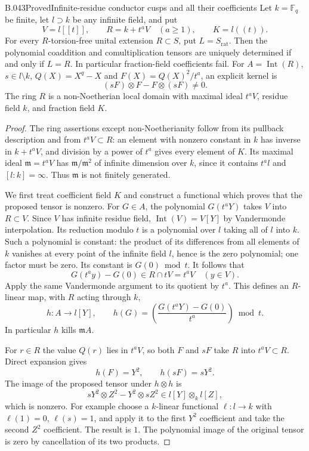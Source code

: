 \begin{saresult}{B.043}{Proved}{Infinite-residue conductor cusps and all their coefficients}
Let $k=\mathbb F_q$ be finite, let $l\supset k$ be any infinite
field, and put
\[
 V=l[[t]],\qquad R=k+t^aV\quad(a\ge1),\qquad K=l((t)).
\]
For every $R$-torsion-free unital extension $R\subset S$, put
$L=S_{\mathrm{rat}}$. Then the polynomial coaddition and
comultiplication tensors are uniquely determined if and only
if $L=R$. In particular fraction-field coefficients fail.
For $A=\operatorname{Int}(R)$, $s\in l\setminus k$,
$Q(X)=X^q-X$ and $F(X)=Q(X)^2/t^a$, an explicit kernel is
\[
 (sF)\otimes F-F\otimes(sF)\ne0.
\]
The ring $R$ is a non-Noetherian local domain with maximal ideal
$t^aV$, residue field $k$, and fraction field $K$.
\end{saresult}
\begin{proof}
The ring assertions except non-Noetherianity follow from its
pullback description and from $t^aV\subset R$: an element with
nonzero constant in $k$ has inverse in $k+t^aV$, and division
by a power of $t^a$ gives every element of $K$.
Its maximal ideal $\mathfrak m=t^aV$ has
$\mathfrak m/\mathfrak m^2$ of infinite dimension over $k$,
since it contains $t^al$ and $[l:k]=\infty$.
Thus $\mathfrak m$ is not finitely generated.

We first treat coefficient field $K$ and construct a functional
which proves that the proposed tensor is nonzero.
For $G\in A$, the polynomial $G(t^aY)$ takes $V$ into
$R\subset V$. Since $V$ has infinite residue field,
$\operatorname{Int}(V)=V[Y]$ by Vandermonde interpolation.
Its reduction modulo $t$ is a polynomial over $l$ taking all
of $l$ into $k$. Such a polynomial is constant: the product of
its differences from all elements of $k$ vanishes at every
point of the infinite field $l$, hence is the zero polynomial;
one factor must be zero. Its constant is $G(0)\bmod t$.
It follows that
\[
 G(t^ay)-G(0)\in R\cap tV=t^aV\quad(y\in V).
\]
Apply the same Vandermonde argument to its quotient by $t^a$.
This defines an $R$-linear map, with $R$ acting through $k$,
\[
 h:A\longrightarrow l[Y],\qquad
 h(G)=\left(\frac{G(t^aY)-G(0)}{t^a}\right)\bmod t.
\]
In particular $h$ kills $\mathfrak m A$.

For $r\in R$ the value $Q(r)$ lies in $t^aV$, so both $F$ and
$sF$ take $R$ into $t^aV\subset R$. Direct expansion gives
\[
 h(F)=Y^2,\qquad h(sF)=sY^2.
\]
The image of the proposed tensor under $h\otimes h$ is
\[
 sY^2\otimes Z^2-Y^2\otimes sZ^2
       \in l[Y]\otimes_k l[Z],
\]
which is nonzero. For example choose a $k$-linear functional
$\ell:l\to k$ with $\ell(1)=0$, $\ell(s)=1$, and apply it
to the first $Y^2$ coefficient and take the second $Z^2$
coefficient. The result is $1$. The polynomial image of the
original tensor is zero by cancellation of its two products.


\end{proof}
